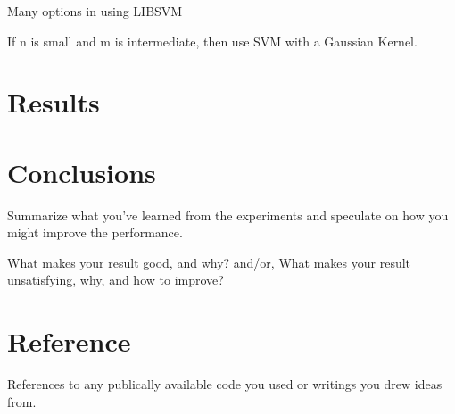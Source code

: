 \documentclass{article}
\begin{document}
Many options in using LIBSVM

If n is small and m is intermediate, then use SVM with a Gaussian Kernel.




\clearpage


\section{Results}

\clearpage


\section{Conclusions}

Summarize what you’ve learned from the experiments and speculate on how you might improve the performance.

What makes your result good, and why? and/or,
What makes your result unsatisfying, why, and how to improve?

\clearpage



\section{Reference}
References to any publically available code you used or writings you drew ideas from.
\clearpage

\end{document}
